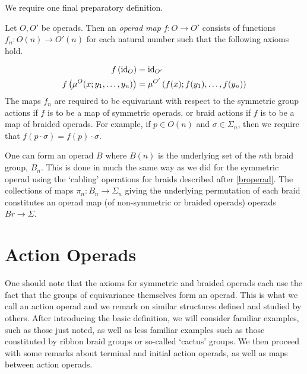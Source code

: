 We require one final preparatory definition.

\begin{Defi}\label{Defi:op_map}
Let $O,O'$ be operads. Then an \textit{operad map} $f \colon O \rightarrow O'$ consists of functions $f_{n} \colon O(n) \rightarrow O'(n)$ for each natural number such that the following axioms hold.

  \begin{align*}
    f\left(\textrm{id}_O\right) &= \textrm{id}_{O'}\\
    f\left(\mu^{O}(x;y_1,\ldots,y_n)\right) &= \mu^{O'}\left(f(x);f(y_1),\ldots,f(y_n)\right)
  \end{align*}
The maps $f_{n}$ are required to be equivariant with respect to the symmetric group actions if $f$ is to be a map of symmetric operads, or braid actions if $f$ is to be a map of braided operads. For example, if $p \in O(n)$ and $\sigma \in \Sigma_n$, then we require that $f(p \cdot \sigma) = f(p) \cdot \sigma$.
\end{Defi}


\begin{example}\label{ex:braid_operad_B}
One can form an operad $B$ where $B(n)$ is the underlying set of the $n$th braid group, $B_{n}$. This is done in much the same way as we did for the symmetric operad using the `cabling' operations for braids described after \cref{broperad}. The collections of maps $\pi_{n} \colon B_{n} \rightarrow \Sigma_{n}$ giving the underlying permutation of each braid constitutes an operad map (of non-symmetric or braided operads) operads $Br \rightarrow \Sigma$.
\end{example}

\section{Action Operads}

One should note that the axioms for symmetric and braided operads each use the fact that the groups of equivariance themselves form an operad. This is what we call an action operad and we remark on similar structures defined and studied by others. After introducing the basic definition, we will consider familiar examples, such as those just noted, as well as less familiar examples such as those constituted by ribbon braid groups or so-called `cactus' groups. We then proceed with some remarks about terminal and initial action operads, as well as maps between action operads.

